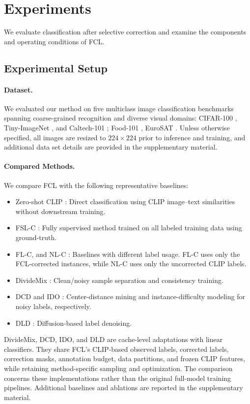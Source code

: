 \documentclass[10pt,twocolumn,letterpaper]{article}
\begin{document}
\section{Experiments}
We evaluate classification after selective correction and examine the components and operating conditions of FCL.
\subsection{Experimental Setup}
\paragraph{Dataset.}
We evaluated our method on five multiclass image classification benchmarks spanning coarse-grained recognition and diverse visual domains: CIFAR-100 \cite{krizhevsky2009cifar100}, Tiny-ImageNet \cite{le2015tinyimagenet}, and Caltech-101 \cite{fei2004caltech101}; Food-101 \cite{bossard2014food101}, EuroSAT \cite{helber2018eurosat}. Unless otherwise specified, all images are resized to $224\times224$ prior to inference and training, and additional data set details are provided in the supplementary material.

\paragraph{Compared Methods.}
We compare FCL with the following representative baselines:
\begin{itemize}
    \item Zero-shot CLIP \cite{radford2021clip}: Direct classification using CLIP image--text similarities without downstream training.
    \item FSL-C \cite{radford2021clip}: Fully supervised method trained on all labeled training data using ground-truth.
    \item FL-C, and NL-C \cite{radford2021clip}: Baselines with different label usage. FL-C uses only the FCL-corrected instances, while NL-C uses only the uncorrected CLIP labels.
    \item DivideMix \cite{li2020dividemix}: Clean/noisy sample separation and consistency training.
    \item DCD \cite{mu2025dcd} and IDO \cite{zhang2025ido}: Center-distance mining and instance-difficulty modeling for noisy labels, respectively.
    \item DLD \cite{hou2025dld}: Diffusion-based label denoising.
\end{itemize}
DivideMix, DCD, IDO, and DLD are cache-level adaptations with linear classifiers. They share FCL's CLIP-based observed labels, corrected labels, correction masks, annotation budget, data partitions, and frozen CLIP features, while retaining method-specific sampling and optimization. The comparison concerns these implementations rather than the original full-model training pipelines. Additional baselines and ablations are reported in the supplementary material.
\end{document}
